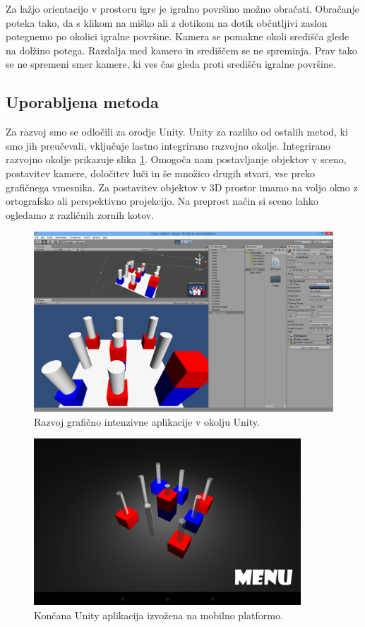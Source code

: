 Za lažjo orientacijo v prostoru igre je igralno površino možno obračati. Obračanje poteka tako, da s klikom na miško ali z dotikom na dotik občutljivi zaslon potegnemo po okolici igralne površine. Kamera se pomakne okoli središča glede na dolžino potega. Razdalja med kamero in središčem se ne spreminja. Prav tako se ne spremeni smer kamere, ki ves čas gleda proti središču igralne površine.

\subsection{Uporabljena metoda}

Za razvoj smo se odločili za orodje Unity. Unity za razliko od ostalih metod, ki smo jih preučevali, vključuje lastno integrirano razvojno okolje. Integrirano razvojno okolje prikazuje slika \ref{mineditor}. Omogoča nam postavljanje objektov v sceno, postavitev kamere, določitev luči in še množico drugih stvari, vse preko grafičnega vmesnika. Za postavitev objektov v 3D prostor imamo na voljo okno z ortografsko ali perspektivno projekcijo. Na preprost način si sceno lahko ogledamo z različnih zornih kotov.


\begin{figure}
\begin{center}
\includegraphics[width=12cm]{pic/min-editor.png}
\end{center}
\caption{Razvoj grafično intenzivne aplikacije v okolju Unity.}
\label{mineditor}
\end{figure} 

\begin{figure}
\begin{center}
\includegraphics[width=10cm]{pic/min-play.png}
\end{center}
\caption{Končana Unity aplikacija izvožena na mobilno platformo.}
\label{minplay}
\end{figure} 

